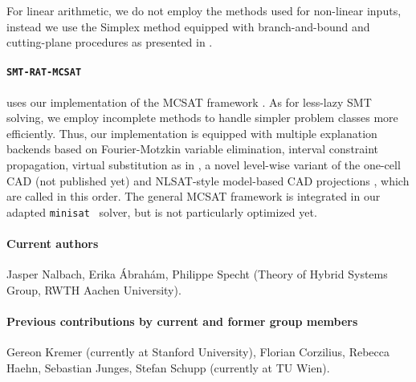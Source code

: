 \documentclass{article}
\begin{document}
For linear arithmetic, we do not employ the methods used for non-linear inputs, instead we use the Simplex method equipped with branch-and-bound and cutting-plane procedures as presented in \cite{DM06}.


\paragraph{\texttt{SMT-RAT-MCSAT}} uses our implementation of the MCSAT framework \cite{Moura2013}.
As for less-lazy SMT solving, we employ incomplete methods to handle simpler problem classes more efficiently. Thus, our implementation is equipped with multiple explanation backends based on Fourier-Motzkin variable elimination, interval constraint propagation, virtual substitution as in \cite{Abraham2017}, a novel level-wise variant of the one-cell CAD \cite{brown2015constructing} (not published yet) and NLSAT-style model-based CAD projections \cite{jovanovic2012solving}, which are called in this order. The general MCSAT framework is integrated in our adapted \texttt{minisat}~\cite{Een2003} solver, but is not particularly optimized yet.

\newpage

\paragraph{Current authors}
Jasper Nalbach, Erika \'Abrah\'am, Philippe Specht
(Theory of Hybrid Systems Group, RWTH Aachen University).

\paragraph{Previous contributions by current and former group members}
Gereon Kremer (currently at Stanford University),
Florian Corzilius,
Rebecca Haehn,
Sebastian Junges,
Stefan Schupp (currently at TU Wien).




\end{document}
